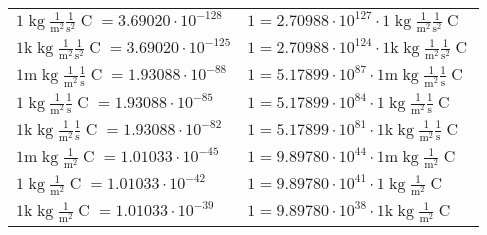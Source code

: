 \begin{center}
\begin{longtable}{l l}
{\color{black}$1 \bm{\mathrm{ }}\operatorname{kg}\frac1{\operatorname{m}^2}\frac1{\operatorname{s}^2}{\operatorname{C}}{} = 3.69020\cdot10^{-128} $}   & {\color{black}$ 1 = 2.70988\cdot10^{127} \cdot 1 \bm{\mathrm{ }}\operatorname{kg}\frac1{\operatorname{m}^2}\frac1{\operatorname{s}^2}{\operatorname{C}}{}$}  \\
{\color{gray}$1 \bm{\mathrm{ k}}\operatorname{kg}\frac1{\operatorname{m}^2}\frac1{\operatorname{s}^2}{\operatorname{C}}{} = 3.69020\cdot10^{-125} $}   & {\color{gray}$ 1 = 2.70988\cdot10^{124} \cdot 1 \bm{\mathrm{ k}}\operatorname{kg}\frac1{\operatorname{m}^2}\frac1{\operatorname{s}^2}{\operatorname{C}}{}$}  \\
{\color{gray}$1 \bm{\mathrm{ m}}\operatorname{kg}\frac1{\operatorname{m}^2}\frac1{\operatorname{s}}{\operatorname{C}}{} = 1.93088\cdot10^{-88} $}   & {\color{gray}$ 1 = 5.17899\cdot10^{87} \cdot 1 \bm{\mathrm{ m}}\operatorname{kg}\frac1{\operatorname{m}^2}\frac1{\operatorname{s}}{\operatorname{C}}{}$}  \\
{\color{black}$1 \bm{\mathrm{ }}\operatorname{kg}\frac1{\operatorname{m}^2}\frac1{\operatorname{s}}{\operatorname{C}}{} = 1.93088\cdot10^{-85} $}   & {\color{black}$ 1 = 5.17899\cdot10^{84} \cdot 1 \bm{\mathrm{ }}\operatorname{kg}\frac1{\operatorname{m}^2}\frac1{\operatorname{s}}{\operatorname{C}}{}$}  \\
{\color{gray}$1 \bm{\mathrm{ k}}\operatorname{kg}\frac1{\operatorname{m}^2}\frac1{\operatorname{s}}{\operatorname{C}}{} = 1.93088\cdot10^{-82} $}   & {\color{gray}$ 1 = 5.17899\cdot10^{81} \cdot 1 \bm{\mathrm{ k}}\operatorname{kg}\frac1{\operatorname{m}^2}\frac1{\operatorname{s}}{\operatorname{C}}{}$}  \\
{\color{gray}$1 \bm{\mathrm{ m}}\operatorname{kg}\frac1{\operatorname{m}^2}{}{\operatorname{C}}{} = 1.01033\cdot10^{-45} $}   & {\color{gray}$ 1 = 9.89780\cdot10^{44} \cdot 1 \bm{\mathrm{ m}}\operatorname{kg}\frac1{\operatorname{m}^2}{}{\operatorname{C}}{}$}  \\
{\color{black}$1 \bm{\mathrm{ }}\operatorname{kg}\frac1{\operatorname{m}^2}{}{\operatorname{C}}{} = 1.01033\cdot10^{-42} $}   & {\color{black}$ 1 = 9.89780\cdot10^{41} \cdot 1 \bm{\mathrm{ }}\operatorname{kg}\frac1{\operatorname{m}^2}{}{\operatorname{C}}{}$}  \\
{\color{gray}$1 \bm{\mathrm{ k}}\operatorname{kg}\frac1{\operatorname{m}^2}{}{\operatorname{C}}{} = 1.01033\cdot10^{-39} $}   & {\color{gray}$ 1 = 9.89780\cdot10^{38} \cdot 1 \bm{\mathrm{ k}}\operatorname{kg}\frac1{\operatorname{m}^2}{}{\operatorname{C}}{}$}  \\

\end{longtable}
\end{center}
